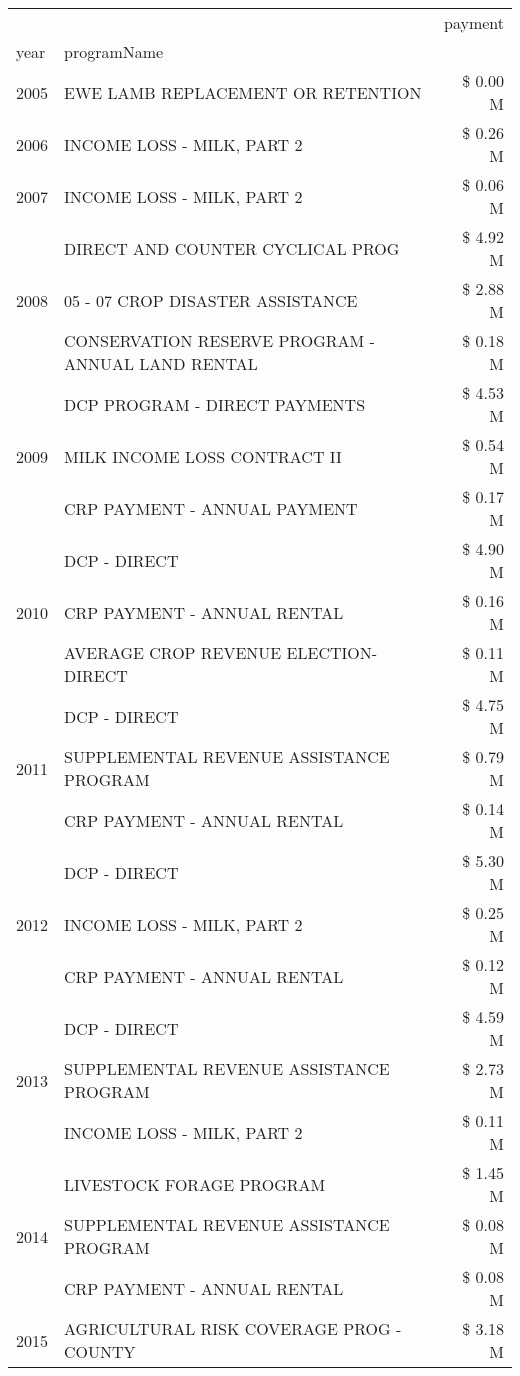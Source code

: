 \begin{tabular}{llr}
\toprule
 &  & payment \\
year & programName &  \\
\midrule
2005 & EWE LAMB REPLACEMENT OR RETENTION & \$ 0.00 M \\
\cline{1-3}
2006 & INCOME LOSS - MILK, PART 2 & \$ 0.26 M \\
\cline{1-3}
2007 & INCOME LOSS - MILK, PART 2 & \$ 0.06 M \\
\cline{1-3}
\multirow[t]{3}{*}{2008} & DIRECT AND COUNTER CYCLICAL PROG & \$ 4.92 M \\
 & 05 - 07 CROP DISASTER ASSISTANCE & \$ 2.88 M \\
 & CONSERVATION RESERVE PROGRAM - ANNUAL LAND RENTAL & \$ 0.18 M \\
\cline{1-3}
\multirow[t]{3}{*}{2009} & DCP PROGRAM - DIRECT PAYMENTS & \$ 4.53 M \\
 & MILK INCOME LOSS CONTRACT II & \$ 0.54 M \\
 & CRP PAYMENT - ANNUAL PAYMENT & \$ 0.17 M \\
\cline{1-3}
\multirow[t]{3}{*}{2010} & DCP - DIRECT & \$ 4.90 M \\
 & CRP PAYMENT - ANNUAL RENTAL & \$ 0.16 M \\
 & AVERAGE CROP REVENUE ELECTION-DIRECT & \$ 0.11 M \\
\cline{1-3}
\multirow[t]{3}{*}{2011} & DCP - DIRECT & \$ 4.75 M \\
 & SUPPLEMENTAL REVENUE ASSISTANCE PROGRAM & \$ 0.79 M \\
 & CRP PAYMENT - ANNUAL RENTAL & \$ 0.14 M \\
\cline{1-3}
\multirow[t]{3}{*}{2012} & DCP - DIRECT & \$ 5.30 M \\
 & INCOME LOSS - MILK, PART 2 & \$ 0.25 M \\
 & CRP PAYMENT - ANNUAL RENTAL & \$ 0.12 M \\
\cline{1-3}
\multirow[t]{3}{*}{2013} & DCP - DIRECT & \$ 4.59 M \\
 & SUPPLEMENTAL REVENUE ASSISTANCE PROGRAM & \$ 2.73 M \\
 & INCOME LOSS - MILK, PART 2 & \$ 0.11 M \\
\cline{1-3}
\multirow[t]{3}{*}{2014} & LIVESTOCK FORAGE PROGRAM & \$ 1.45 M \\
 & SUPPLEMENTAL REVENUE ASSISTANCE PROGRAM & \$ 0.08 M \\
 & CRP PAYMENT - ANNUAL RENTAL & \$ 0.08 M \\
\cline{1-3}
\multirow[t]{3}{*}{2015} & AGRICULTURAL RISK COVERAGE PROG - COUNTY & \$ 3.18 M \\

\end{tabular}
